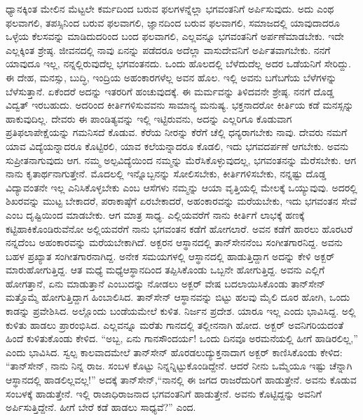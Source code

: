 ಧ್ಯಾನಕ್ಕಿಂತ ಮೇಲಿನ ಮೆಟ್ಟಲೇ ಕರ್ಮದಿಂದ ಬರುವ ಫಲಗಳನ್ನೆಲ್ಲಾ ಭಗವಂತನಿಗೆ ಅರ್ಪಿಸುವುದು. ಅದು ಎಂಥ ಫಲವಾಗಲಿ, ತಪಸ್ಸಿನಿಂದ ಬರುವ ಫಲವಾಗಲಿ, ಜ್ಞಾನದಿಂದ ಬರುವ ಫಲವಾಗಲಿ, ಸಮಾಜದಲ್ಲಿ ಯಾವುದಾದರೂ ಒಳ್ಳೆಯ ಕೆಲಸವನ್ನು ಮಾಡಿದುದರಿಂದ ಬಂದ ಫಲವಾಗಲಿ, ಎಲ್ಲವನ್ನೂ ಭಗವಂತನಿಗೆ ಅರ್ಪಣೆಮಾಡಬೇಕು. ಇದೇ ಎಲ್ಲಕ್ಕಿಂತ ಶ್ರೇಷ್ಠ. ಜೀವನದಲ್ಲಿ ನಾವು ಏನನ್ನು ಪಡೆದರೂ ಅದೆಲ್ಲಾ ವಾಸುದೇವನಿಗೆ ಅರ್ಪಿತವಾಗಬೇಕು. ನನಗೆ ಯಾವುದೂ ಇಲ್ಲ, ನನ್ನಲ್ಲಿರುವುದೆಲ್ಲ ಭಗವಂತನದು. ಒಂದು ಹೊಲದಲ್ಲಿ ಬೆಳೆದುದೆಲ್ಲ ಅದರ ಒಡೆಯನಿಗೆ ಸೇರಿದ್ದು. ಈ ದೇಹ, ಮನಸ್ಸು, ಬುದ್ಧಿ, ಇಂದ್ರಿಯ ಅಹಂಕಾರಗಳೆಲ್ಲ ಅವನ ಹೊಲ. ಇಲ್ಲಿ ಅವನು ಬಗೆಬಗೆಯ ಬೆಳೆಗಳನ್ನು ಬೆಳೆಸುತ್ತಾನೆ. ಏಕೆಂದರೆ ಅದನ್ನು ಇತರರಿಗೆ ಹಂಚುವುದಕ್ಕೆ. ಈ ಮರ್ಮವನ್ನು ತಿಳಿದವನೇ ಶ್ರೇಷ್ಠ. ನನಗೆ ದೊಡ್ಡ ವಿದ್ವತ್ ಇರಬಹುದು. ಅದರಿಂದ ಕೀರ್ತಿಗಳಿಸುವವನು ಸಾಮಾನ್ಯ ಮನುಷ್ಯ. ಭಕ್ತನಾದರೋ ಕೀರ್ತಿಯ ಕಡೆ ಮನಸ್ಸನ್ನು ಹಾಕುವುದಿಲ್ಲ. ದೇವರು ಈ ಪಾಂಡಿತ್ಯವನ್ನು ಇಲ್ಲಿ ಇಟ್ಟಿರುವನು, ಅದನ್ನು ಎಲ್ಲರಿಗೂ ಕೊಡುವಾಗ ಪ್ರತಿಫಲಾಪೇಕ್ಷೆಯನ್ನು ಗಮನಿಸದೆ ಕೊಡುವ. ಕೆರೆಯ ನೀರನ್ನು ಕೆರೆಗೆ ಚೆಲ್ಲಿ ಧನ್ಯರಾಗಬೇಕು ನಾವು. ದೇವರು ನಮಗೆ ಯಾವ ವಿದ್ಯೆಯನ್ನಾದರೂ ಕೊಟ್ಟಿರಲಿ, ಯಾವ ಕಲೆಯನ್ನಾದರೂ ಕೊಡಲಿ, ಇದು ಭಗವದರ್ಪಣೆ ಆಗಬೇಕು. ಅವನು ಸುಪ್ರೀತನಾಗುವುದು ಆಗ. ನಮ್ಮ ಅಲ್ಪವಿದ್ಯೆಯಿಂದ ನಮ್ಮನ್ನು ಮೆರೆಸಿಕೊಳ್ಳುವುದಲ್ಲ, ಭಗವಂತನನ್ನು ಮೆರೆಸಬೇಕು. ಆಗ ನಾನು ಕೃತಾರ್ಥನಾಗುತ್ತೇನೆ. ಮೊದಲಲ್ಲಿ ಇನ್ನೊಬ್ಬನನ್ನು ಸೋಲಿಸಬೇಕು, ಕೀರ್ತಿಗಳಿಸಬೇಕು, ನನ್ನಷ್ಟು ದೊಡ್ಡ ವಿದ್ಯಾವಂತನೇ ಇಲ್ಲ ಎನಿಸಿಕೊಳ್ಳಬೇಕು ಎಂಬ ಆಸೆಗಳು ನಮ್ಮನ್ನು ಆಯಾ ವೃತ್ತಿಯಲ್ಲಿ ಮೇಲಕ್ಕೆ ಒಯ್ಯುವುವು. ಅದರಲ್ಲಿ ಶಿಖರವನ್ನು ಮುಟ್ಟ ಬೇಕಾದರೆ, ಪರಾಕಾಷ್ಠೆಗೆ ಏರಬೇಕಾದರೆ, ಅಹಂಕಾರವನ್ನು ಮರೆಯಬೇಕು, ಇದು ಭಗವಂತನ ಸೇವೆ ಎಂಬ ದೃಷ್ಟಿಯಿಂದ ಮಾಡಬೇಕು. ಆಗ ಮಾತ್ರ ಸಾಧ್ಯ. ಎಲ್ಲಿಯವರೆಗೆ ನಾನು ಕೀರ್ತಿಗೆ ಲಾಭಕ್ಕೆ ಹಣಕ್ಕೆ ಕಟ್ಟಿಹಾಕಿಕೊಂಡಿರುವೆನೋ ಅಲ್ಲಿಯವರೆಗೆ ನಾನು ಭಗವಂತನ ಕಡೆಗೆ ಹೋಗಲಾರೆ. ಅವನ ಕಡೆಗೆ ಹಾರಲು ಹೊರಟರೆ ನನ್ನದೆಂಬ ಅಹಂಕಾರವನ್ನು ಮರೆಯಬೇಕಾಗಿದೆ. ಅಕ್ಬರನ ಆಸ್ಥಾನದಲ್ಲಿ ತಾನ್​ಸೇನನೆಂಬ ಸಂಗೀತ\-ಗಾರನಿದ್ದ. ಅವನು ಬಹಳ ಪ್ರಖ್ಯಾತ ಸಂಗೀತ\-ಗಾರನಾಗಿದ್ದ. ಅನೇಕ ಸಮಯಗಳಲ್ಲಿ ಆಸ್ಥಾನದಲ್ಲಿ ಹಾಡುತ್ತಿದ್ದಾಗ ಅದನ್ನು ಕೇಳಿ ಅಕ್ಬರ್ ಮಾರುಹೋಗುತ್ತಿದ್ದ. ಆತ ಮಧ್ಯೆ ಮಧ್ಯೆ\break ಆಸ್ಥಾನದಿಂದ ತಪ್ಪಿಸಿಕೊಂಡು ಒಬ್ಬನೇ ಹೋಗುತ್ತಿದ್ದ. ಅವನು ಎಲ್ಲಿಗೆ ಹೋಗತ್ತಾನೆ, ಏನು ಮಾಡುತ್ತಾನೆ ಎಂಬುದನ್ನು ನೋಡಲು ಅಕ್ಬರ್ ವೇಷ ಬದಲಾಯಿಸಿಕೊಂಡು ತಾನ್​ಸೇನ್ ಮತ್ತೊಮ್ಮೆ ಹೋಗುತ್ತಿದ್ದಾಗ ಹಿಂಬಾಲಿಸಿದ. ತಾನ್​ಸೇನ್ ಆಸ್ಥಾನವನ್ನು ಬಿಟ್ಟು ಹಲವು ಮೈಲಿ ದೂರ ಹೋಗಿ, ಒಂದು ಕಾಡನ್ನು ಪ್ರವೇಶಿಸಿದ. ಅಲ್ಲೊಂದು ಬಂಡೆಯಮೇಲೆ ಕುಳಿತ. ನಿರ್ಜನ ಪ್ರದೇಶ. ಯಾರೂ ಇಲ್ಲ ಎಂದು ಭಾವಿಸಿದ್ದ. ಅಲ್ಲಿ ಕುಳಿತು ಹಾಡಲು ಪ್ರಾರಂಭಿಸಿದ. ಎಲ್ಲವನ್ನೂ ಮರೆತು ಗಾನದಲ್ಲಿ ತಲ್ಲೀನನಾಗಿ ಹೋದ. ಅಕ್ಬರ್ ಅವನಿಗರಿಯದಂತೆ ಹಿಂದೆ ಕುಳಿತುಕೊಂಡು ಕೇಳಿದ. “ಅಬ್ಬ, ಏನು ಗಾನಸೌಂದರ್ಯ! ಒಂದು ದಿನವೂ ಅರಮನೆಯಲ್ಲಿ ಹೀಗೆ ಹಾಡಿರಲಿಲ್ಲ,” ಎಂದು ಭಾವಿಸಿದ. ಸ್ವಲ್ಪ ಕಾಲವಾದಮೇಲೆ ತಾನ್​ಸೇನ್ ಹೊರಡಲುದ್ಯುಕ್ತನಾದಾಗ ಅಕ್ಬರ್ ಕಾಣಿಸಿಕೊಂಡು ಕೇಳಿದ: “ತಾನ್​ಸೇನ್, ನಾನು ನಿನ್ನ ರಾಜ. ಸಂಬಳ ಕೊಟ್ಟು ನಿನ್ನನ್ನಿಟ್ಟುಕೊಂಡಿದ್ದೇನೆ. ಆದರೆ ನೀನು ಒಮ್ಮೆಯೂ ಇಷ್ಟು ಚೆನ್ನಾಗಿ ಆಸ್ಥಾನದಲ್ಲಿ ಹಾಡಲಿಲ್ಲವಲ್ಲ!” ಅದಕ್ಕೆ ತಾನ್​ಸೇನ್,\break “ನಾನಲ್ಲಿ ಈ ಜಗದ ರಾಜರೆದುರಿಗೆ ಹಾಡುತ್ತೇನೆ. ಅವನು ಕೊಡುವ ಸಂಬಳಕ್ಕೆ ಹಾಡುತ್ತೇನೆ. ಇಲ್ಲಿ ರಾಜಾಧಿರಾಜನಾದ ಭಗವಂತನಿಗೆ ಹಾಡುತ್ತೇನೆ. ಅವನು ಕೊಟ್ಟಿದ್ದನ್ನು ಅವನಿಗೆ ಅರ್ಪಿಸುತ್ತಿದ್ದೇನೆ. ಹೀಗೆ ಬೇರೆ ಕಡೆ ಹಾಡಲು ಸಾಧ್ಯವೆ?” ಎಂದ.


